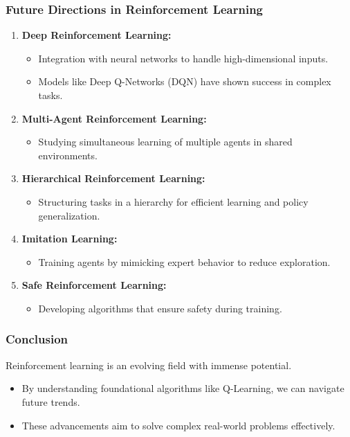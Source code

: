 \documentclass{beamer}
\begin{document}
\begin{frame}[fragile]
    \frametitle{Future Directions in Reinforcement Learning}
    \begin{enumerate}
        \item \textbf{Deep Reinforcement Learning:}
            \begin{itemize}
                \item Integration with neural networks to handle high-dimensional inputs.
                \item Models like Deep Q-Networks (DQN) have shown success in complex tasks.
            \end{itemize}
        
        \item \textbf{Multi-Agent Reinforcement Learning:}
            \begin{itemize}
                \item Studying simultaneous learning of multiple agents in shared environments.
            \end{itemize}
        
        \item \textbf{Hierarchical Reinforcement Learning:}
            \begin{itemize}
                \item Structuring tasks in a hierarchy for efficient learning and policy generalization.
            \end{itemize}
        
        \item \textbf{Imitation Learning:}
            \begin{itemize}
                \item Training agents by mimicking expert behavior to reduce exploration.
            \end{itemize}
        
        \item \textbf{Safe Reinforcement Learning:}
            \begin{itemize}
                \item Developing algorithms that ensure safety during training.
            \end{itemize}
    \end{enumerate}
\end{frame}

\begin{frame}[fragile]
    \frametitle{Conclusion}
    Reinforcement learning is an evolving field with immense potential. 
    \begin{itemize}
        \item By understanding foundational algorithms like Q-Learning, we can navigate future trends.
        \item These advancements aim to solve complex real-world problems effectively.
    \end{itemize}
\end{frame}
\end{document}
